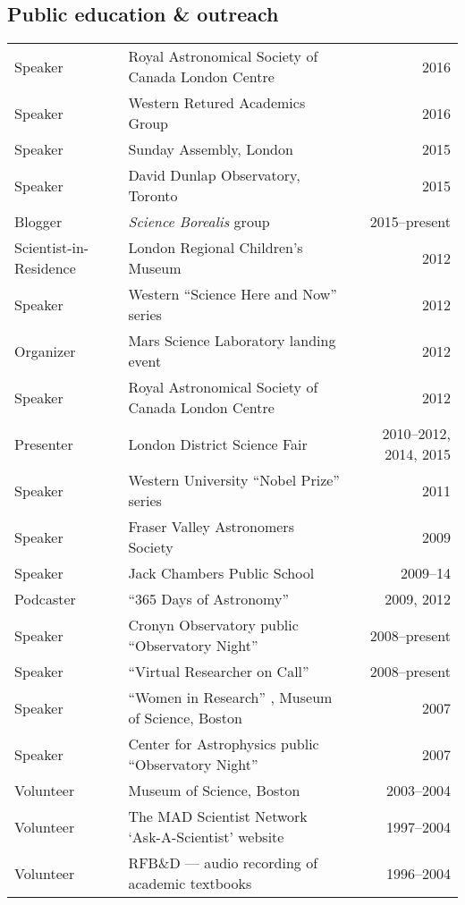 \documentclass[12pt]{article}
\begin{document}
\subsection{Public education \& outreach}
\begin{tabularx}{\textwidth}{lXr}
Speaker& Royal Astronomical Society of Canada London Centre& 2016\\
Speaker& Western Retured Academics Group& 2016\\
Speaker & Sunday Assembly, London  & 2015\\
Speaker & David Dunlap Observatory, Toronto& 2015\\
Blogger & {\it Science Borealis} group & 2015--present\\
Scientist-in-Residence& London Regional Children's Museum& 2012\\
Speaker& Western ``Science Here and Now'' series& 2012\\
Organizer& Mars Science Laboratory landing event& 2012\\
Speaker& Royal Astronomical Society of Canada London Centre& 2012\\
Presenter& London District Science Fair& 2010--2012, 2014, 2015\\
Speaker& Western University ``Nobel Prize'' series& 2011\\
Speaker& Fraser Valley Astronomers Society& 2009\\
Speaker& Jack Chambers Public School& 2009--14\\
Podcaster &  ``365 Days of Astronomy''  &2009, 2012\\
Speaker& Cronyn Observatory public ``Observatory Night'' & 2008--present\\
Speaker& ``Virtual Researcher on Call'' & 2008--present\\
Speaker & ``Women in Research'' , Museum of Science, Boston& 2007\\
Speaker& Center for Astrophysics public ``Observatory Night'' & 2007\\
Volunteer& Museum of Science, Boston& 2003--2004\\
Volunteer& The MAD Scientist Network `Ask-A-Scientist' website& 1997--2004\\
Volunteer& RFB\&D --- audio recording of academic textbooks& 1996--2004\\
\end{tabularx}
\end{document}
